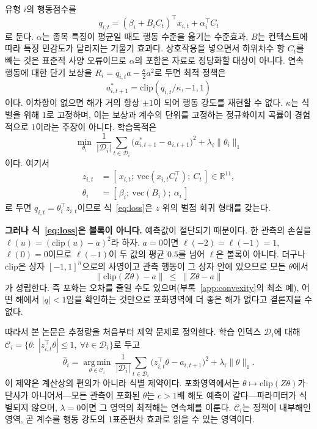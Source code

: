 유형 $i$의 행동점수를
\begin{equation}
q_{i,t}=(\beta_i+B_iC_t)^{\top}x_{i,t}+\alpha_i^{\top}C_t
\label{eq:score}
\end{equation}
로 둔다. $\alpha$는 종목 특징이 평균일 때도 행동 수준을 옮기는 수준효과, $B$는
컨텍스트에 따라 특징 민감도가 달라지는 기울기 효과다. 상호작용을 넣으면서 하위차수
항 $C_t$를 빼는 것은 표준적 사양 오류이므로 $\alpha$의 포함은 자료로 정당화할
대상이 아니다. 연속 행동에 대한 단기 보상을
$R_i=q_{i,t}a-\tfrac{\kappa}{2}a^{2}$로 두면 최적 정책은
\begin{equation}
a^{*}_{i,t+1}=\mathrm{clip}(q_{i,t}/\kappa,-1,1)
\label{eq:policy}
\end{equation}
이다. 이차항이 없으면 해가 거의 항상 $\pm1$이 되어 행동 강도를 재현할 수 없다.
$\kappa$는 식별을 위해 1로 고정하며, 이는 보상과 계수의 단위를 고정하는 정규화이지
곡률이 경험적으로 1이라는 주장이 아니다. 학습목적은
\begin{equation}
\min_{\theta_i}\ \frac{1}{|\mathcal{D}_i|}
\sum_{t\in\mathcal{D}_i}\!\bigl(a^{*}_{i,t+1}-a_{i,t+1}\bigr)^{2}
+\lambda_i\lVert\theta_i\rVert_1
\label{eq:loss}
\end{equation}
이다. 여기서
\[
\begin{aligned}
z_{i,t}&=[\,x_{i,t};\ \mathrm{vec}(x_{i,t}C_t^{\top});\ C_t\,]\in\mathbb{R}^{11},\\
\theta_i&=[\,\beta_i;\ \mathrm{vec}(B_i);\ \alpha_i\,]
\end{aligned}
\]
로 두면 $q_{i,t}=\theta_i^{\top}z_{i,t}$이므로 식~\eqref{eq:loss}은 $z$ 위의 벌점 회귀
형태를 갖는다.

\textbf{그러나 식~\eqref{eq:loss}은 볼록이 아니다.} 예측값이 절단되기 때문이다.
한 관측의 손실을
$\ell(u)=(\mathrm{clip}(u)-a)^2$라 하자. $a=0$이면
$\ell(-2)=\ell(-1)=1$, $\ell(0)=0$이므로
$\ell(-1)$이 두 값의 평균 $0.5$를 넘어 $\ell$은 볼록이 아니다. 더구나 $\mathrm{clip}$은 상자
$[-1,1]^{n}$으로의 사영이고 관측 행동이 그 상자 안에 있으므로 모든 $\theta$에서
\[
\lVert\mathrm{clip}(Z\theta)-a\rVert\ \le\ \lVert Z\theta-a\rVert
\]
가 성립한다. 즉 포화는 오차를 줄일 수도 있으며(부록~\ref{app:convexity}의 최소 예),
어떤 해에서 $|q|<1$임을 확인하는 것만으로 포화영역에 더 좋은 해가 없다고 결론지을 수
없다.

따라서 본 논문은 추정량을 처음부터 제약 문제로 정의한다. 학습 인덱스
$\mathcal{D}_i$에 대해 $\mathcal{C}_i=\{\theta:\ |z_{i,t}^{\top}\theta|\le 1,\
\forall t\in\mathcal{D}_i\}$로 두고
\begin{equation}
\hat\theta_i=\operatorname*{arg\,min}_{\theta\in\mathcal{C}_i}\ \frac{1}{|\mathcal{D}_i|}
\sum_{t\in\mathcal{D}_i}\bigl(z_{i,t}^{\top}\theta-a_{i,t+1}\bigr)^{2}
+\lambda_i\lVert\theta\rVert_1 .
\label{eq:closs}
\end{equation}
이 제약은 계산상의 편의가 아니라 식별 제약이다. 포화영역에서는
$\theta\mapsto\mathrm{clip}(Z\theta)$가 단사가 아니어서---모든 관측이 포화된 $\theta$는
$c>1$배 해도 예측이 같다---파라미터가 식별되지 않으며, $\lambda=0$이면 그 영역의
최적해는 연속체를 이룬다. $\mathcal{C}_i$는 정책이 내부해인 영역, 곧 계수를 행동 강도의
1표준편차 효과로 읽을 수 있는 영역이다.

